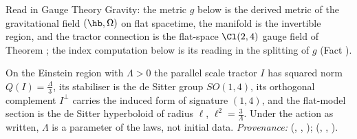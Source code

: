 Read in Gauge Theory Gravity: the metric $g$ below is the derived metric of the gravitational field $(\hb, \Omega)$ on flat spacetime, the manifold is the invertible region, and the tractor connection is the flat-space $\Cl(2,4)$ gauge field of Theorem ; the index computation below is its reading in the splitting of $g$ (Fact ).

On the Einstein region with $\Lambda > 0$ the parallel scale tractor $I$ has squared norm $Q(I) = \tfrac{\Lambda}{3}$, its stabiliser is the de Sitter group $SO(1,4)$, its orthogonal complement $I^{\perp}$ carries the induced form of signature $(1,4)$, and the flat-model section is the de Sitter hyperboloid of radius $\ell$, $\ell^{2} = \tfrac{3}{\Lambda}$. Under the action as written, $\Lambda$ is a parameter of the laws, not initial data. \emph{Provenance:} \cite[Thm.~4.7, Prop.~4.10, Prop.~4.4]{ButlerT6} (, , ); \cite[Fact~2.1, Thm.~3.1, Prop.~5.8]{ButlerT10} (, , ).
